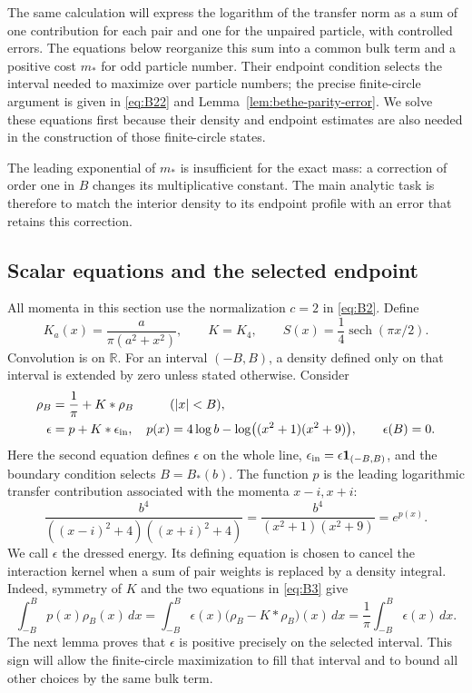 The same calculation will express the logarithm of the transfer norm as
a sum of one contribution for each pair and one for the unpaired particle,
with controlled errors.  The equations below reorganize this sum into a common bulk term and a
positive cost $m_*$ for odd particle number.  Their endpoint condition
selects the interval needed to maximize over particle numbers; the precise
finite-circle argument is given in \eqref{eq:B22} and
Lemma~\ref{lem:bethe-parity-error}.  We solve these equations first because
their density and endpoint estimates are also needed in the construction
of those finite-circle states.

The leading exponential of $m_*$ is insufficient for the exact mass:
a correction of order one in $B$ changes its multiplicative constant.
The main analytic task is therefore to match the interior density to its
endpoint profile with an error that retains this correction.

\subsection{Scalar equations and the selected endpoint}

All momenta in this section use the normalization $c=2$ in
\eqref{eq:B2}.  Define
\[
 K_a(x)=\frac{a}{\pi(a^2+x^2)},\qquad K=K_4,
 \qquad S(x)=\frac14\operatorname{sech}(\pi x/2).
\]
Convolution is on $\mathbb R$.  For an interval $(-B,B)$, a density defined
only on that interval is extended by zero unless stated otherwise.
Consider
\begin{equation}
 \begin{aligned}
 \rho_B&=\frac1\pi+K*\rho_B&&(|x|<B),\\
 \epsilon&=p+K*\epsilon_{\rm in},&
 p(x)&=4\log b-\log\bigl((x^2+1)(x^2+9)\bigr),\qquad \epsilon(B)=0.
 \end{aligned}
 \label{eq:B3}
\end{equation}
Here the second equation defines $\epsilon$ on the whole line,
$\epsilon_{\rm in}=\epsilon\mathbf1_{(-B,B)}$, and the boundary condition
selects $B=B_*(b)$.  The function $p$ is the leading logarithmic transfer
contribution associated with the momenta $x-i,x+i$:
\[
 \frac{b^4}{((x-i)^2+4)((x+i)^2+4)}
 =\frac{b^4}{(x^2+1)(x^2+9)}=e^{p(x)}.
\]
We call $\epsilon$ the dressed energy.  Its defining equation is chosen
to cancel the interaction kernel when a sum of pair weights is replaced
by a density integral.  Indeed, symmetry of $K$ and the two equations
in \eqref{eq:B3} give
\[
 \int_{-B}^B p(x)\rho_B(x)\,dx
 =\int_{-B}^B\epsilon(x)\bigl(\rho_B-K*\rho_B\bigr)(x)\,dx
 =\frac1\pi\int_{-B}^B\epsilon(x)\,dx.
\]
The next lemma proves that $\epsilon$ is positive precisely on the selected
interval.  This sign will allow the finite-circle maximization to fill
that interval and to bound all other choices by the same bulk term.

